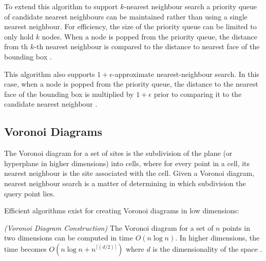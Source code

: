 \documentclass[mcs]{scsthesis}
\begin{document}
To extend this algorithm to support \(k\)-nearest neighbour search a priority
queue of candidate nearest neighbours can be maintained rather than using a
single nearest neighbour. For efficiency, the size of the priority queue can be
limited to only hold \(k\) nodes. When a node is popped from the
priority queue, the distance from th \(k\)-th nearest neighbour is compared to
the distance to nearest face of the bounding box \cite{samet}.

This algorithm also supports \(1 + \epsilon\)-approximate nearest-neighbour
search. In this case, when a node is popped from the priority queue, the
distance to the nearest face of the bounding box is multiplied by
\(1 + \epsilon\) prior to comparing it to the candidate nearest neighbour
\cite{samet}.

\subsection{Voronoi Diagrams}

The Voronoi diagram for a set of sites is the subdivision of the plane (or
hyperplane in higher dimensions) into cells, where for every point in a cell,
its nearest neighbour is the site associated with the cell. Given a Voronoi
diagram, nearest neighbour search is a matter of determining in which
subdivision the query point lies.

Efficient algorithms exist for creating Voronoi diagrams in low dimensions:

\begin{thm} \emph{(Voronoi Diagram Construction)}
The Voronoi diagram for a set of $n$ points in two dimensions can be computed
in time \(O(n \log n)\). In higher dimensions, the time becomes
\(O(n \log n + n^{\lceil(d/2)\rceil})\) where $d$ is the dimensionality of the
space \cite{dutch}.
\end{thm}
\end{document}

